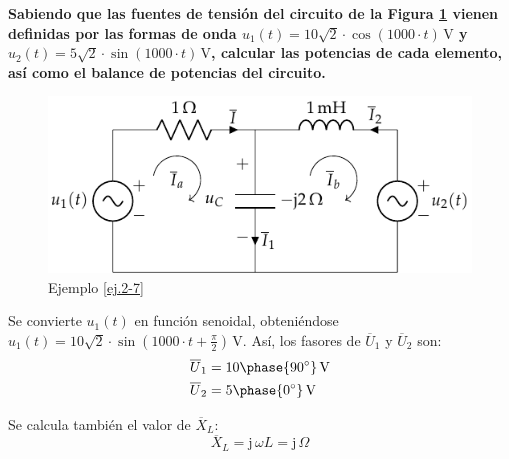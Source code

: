 	\vspace{4mm}
	\begin{example}\label{ej.2-7}
          \textbf{Sabiendo que las fuentes de tensión del circuito de
            la Figura \ref{fig.problema9_garri} vienen definidas por
            las formas de onda
            $u_1(t)=10\sqrt{2}\cdot \cos(1000\cdot t) \,\si{\volt}$ y
            $u_2(t)=5\sqrt{2}\cdot \sin(1000\cdot t) \,\si{\volt}$, calcular las
            potencias de cada elemento, así como el balance de
            potencias del circuito. }
          \begin{figure}[H]
            \centering
            \includegraphics[width=0.6\linewidth]{../figs/ej7_BT2.pdf}
            \caption{Ejemplo \ref{ej.2-7}}
            \label{fig.problema9_garri}
          \end{figure}
		
          Se convierte $u_1(t)$ en función senoidal, obteniéndose
          $u_1(t)=10\sqrt{2}\cdot \sin(1000\cdot
          t+\frac{\pi}{2}) \,\si{\volt}$. Así, los fasores de $\overline{U}_1$ y
          $\overline{U}_2$ son:
          \begin{align*}
            \overline{U}_1&=10\phase{90^\circ}\,\si{\volt}\\
            \overline{U}_2&=5\phase{0^\circ}\,\si{\volt}
          \end{align*}
		
          Se calcula también el valor de $\overline{X}_L$:
          \begin{equation*}
            \overline{X}_L=\mathrm{j}\,\omega L=\mathrm{j}\,\Omega
          \end{equation*}
		

\end{example}
